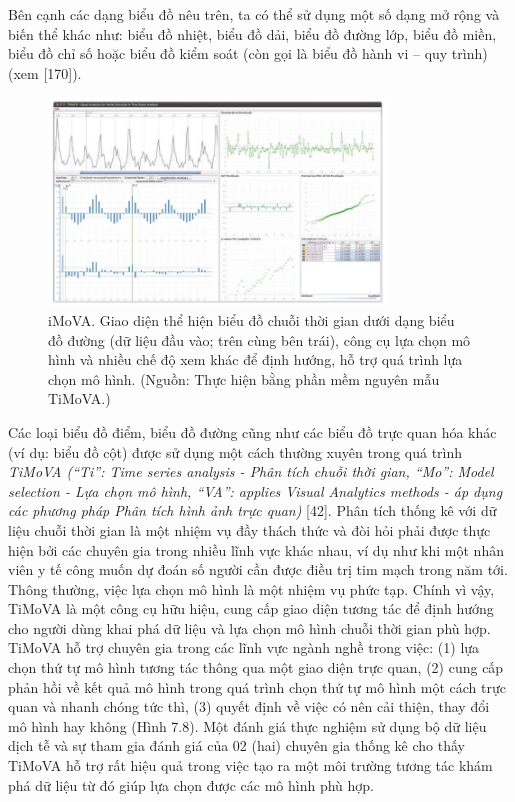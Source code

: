 \\ \\ 
Bên cạnh các dạng biểu đồ nêu trên, ta có thể sử dụng một số dạng mở rộng và biến thể khác như: biểu đồ nhiệt, biểu đồ dải, biểu đồ đường lớp, biểu đồ miền, biểu đồ chỉ số hoặc biểu đồ kiểm soát (còn gọi là biểu đồ hành vi – quy trình) (xem [170]).   
\begin{figure}[H] %
    \centering %
    \includegraphics[width=0.8\textwidth]{assets/fig_7_8.png} 
    \caption{iMoVA. Giao diện thể hiện biểu đồ chuỗi thời gian dưới dạng biểu đồ đường (dữ liệu đầu vào; trên cùng bên trái), công cụ lựa chọn mô hình và nhiều chế độ xem khác để định hướng, hỗ trợ quá trình lựa chọn mô hình. (Nguồn: Thực hiện bằng phần mềm nguyên mẫu TiMoVA.)} %
    \label{fig:f7.8}
\end{figure}
Các loại biểu đồ điểm, biểu đồ đường cũng như các biểu đồ trực quan hóa khác (ví dụ: biểu đồ cột) được sử dụng một cách thường xuyên trong quá trình \textit{TiMoVA (“Ti”: Time series analysis - Phân tích chuỗi thời gian, “Mo”: Model selection - Lựa chọn mô hình, “VA”: applies Visual Analytics methods - áp dụng các phương pháp Phân tích hình ảnh trực quan)} [42]. Phân tích thống kê với dữ liệu chuỗi thời gian là một nhiệm vụ đầy thách thức và đòi hỏi phải được thực hiện bởi các chuyên gia trong nhiều lĩnh vực khác nhau, ví dụ như khi một nhân viên y tế công muốn dự đoán số người cần được điều trị tim mạch trong năm tới. Thông thường, việc lựa chọn mô hình là một nhiệm vụ phức tạp. Chính vì vậy, TiMoVA là một công cụ hữu hiệu, cung cấp giao diện tương tác để định hướng cho người dùng khai phá dữ liệu và lựa chọn mô hình chuỗi thời gian phù hợp. TiMoVA hỗ trợ chuyên gia trong các lĩnh vực ngành nghề trong việc: (1) lựa chọn thứ tự mô hình tương tác thông qua một giao diện trực quan, (2) cung cấp phản hồi về kết quả mô hình trong quá trình chọn thứ tự mô hình một cách trực quan và nhanh chóng tức thì, (3) quyết định về việc có nên cải thiện, thay đổi mô hình hay không (Hình 7.8). Một đánh giá thực nghiệm sử dụng bộ dữ liệu dịch tễ và sự tham gia đánh giá của 02 (hai) chuyên gia thống kê cho thấy TiMoVA hỗ trợ rất hiệu quả trong việc tạo ra một môi trường tương tác khám phá dữ liệu từ đó giúp lựa chọn được các mô hình phù hợp.